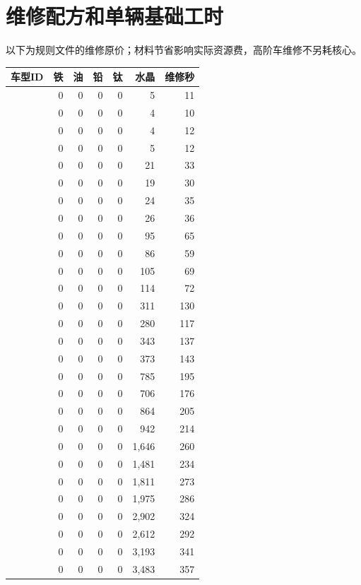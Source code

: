 \section{维修配方和单辆基础工时}
以下为规则文件的维修原价；材料节省影响实际资源费，高阶车维修不另耗核心。
\begin{small}
\begin{longtable}{@{}P{32mm}rrrrrr@{}}
\toprule 车型ID & 铁 & 油 & 铅 & 钛 & 水晶 & 维修秒 \\
\midrule\endhead
{} & 0 & 0 & 0 & 0 & 5 & 11 \\
 & 0 & 0 & 0 & 0 & 4 & 10 \\
 & 0 & 0 & 0 & 0 & 4 & 12 \\
 & 0 & 0 & 0 & 0 & 5 & 12 \\
 & 0 & 0 & 0 & 0 & 21 & 33 \\
 & 0 & 0 & 0 & 0 & 19 & 30 \\
 & 0 & 0 & 0 & 0 & 24 & 35 \\
 & 0 & 0 & 0 & 0 & 26 & 36 \\
 & 0 & 0 & 0 & 0 & 95 & 65 \\
 & 0 & 0 & 0 & 0 & 86 & 59 \\
 & 0 & 0 & 0 & 0 & 105 & 69 \\
 & 0 & 0 & 0 & 0 & 114 & 72 \\
 & 0 & 0 & 0 & 0 & 311 & 130 \\
 & 0 & 0 & 0 & 0 & 280 & 117 \\
 & 0 & 0 & 0 & 0 & 343 & 137 \\
 & 0 & 0 & 0 & 0 & 373 & 143 \\
 & 0 & 0 & 0 & 0 & 785 & 195 \\
 & 0 & 0 & 0 & 0 & 706 & 176 \\
 & 0 & 0 & 0 & 0 & 864 & 205 \\
 & 0 & 0 & 0 & 0 & 942 & 214 \\
 & 0 & 0 & 0 & 0 & 1,646 & 260 \\
 & 0 & 0 & 0 & 0 & 1,481 & 234 \\
 & 0 & 0 & 0 & 0 & 1,811 & 273 \\
 & 0 & 0 & 0 & 0 & 1,975 & 286 \\
 & 0 & 0 & 0 & 0 & 2,902 & 324 \\
 & 0 & 0 & 0 & 0 & 2,612 & 292 \\
 & 0 & 0 & 0 & 0 & 3,193 & 341 \\
 & 0 & 0 & 0 & 0 & 3,483 & 357 \\
\bottomrule
\end{longtable}
\end{small}
\clearpage
